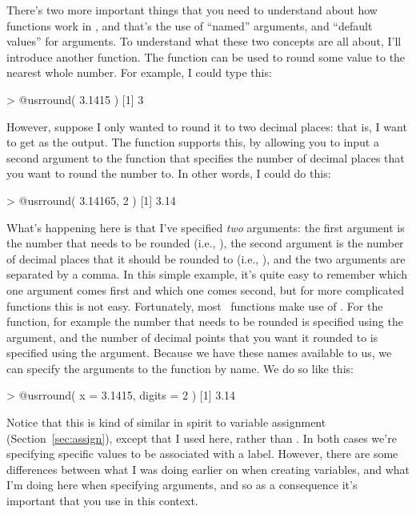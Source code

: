 There's two more important things that you need to understand about how functions work in \R, and that's the use of ``named'' arguments, and ``default values'' for arguments. To understand what these two concepts are all about, I'll introduce another function. The  function can be used to round some value to the nearest whole number. For example, I could type this:
\begin{rblock1}
> @usr{round( 3.1415 )}
[1] 3
\end{rblock1}
However, suppose I only wanted to round it to two decimal places: that is, I want to get  as the output. The  function supports this, by allowing you to input a second argument to the function that specifies the number of decimal places that you want to round the number to. In other words, I could do this: 
\begin{rblock1}
> @usr{round( 3.14165, 2 )}
[1] 3.14
\end{rblock1}
What's happening here is that I've specified {\it two} arguments: the first argument is the number that needs to be rounded (i.e., ), the second argument is the number of decimal places that it should be rounded to (i.e., ), and the two arguments are separated by a comma. In this simple example, it's quite easy to remember which one argument comes first and which one comes second, but for more complicated functions this is not easy. Fortunately, most \R\ functions make use of . For the  function, for example the number that needs to be rounded is specified using the  argument, and the number of decimal points that you want it rounded to is specified using the  argument. Because we have these names available to us, we can specify the arguments to the function by name. We do so like this:
\begin{rblock1}
> @usr{round( x = 3.1415, digits = 2 )}
[1] 3.14
\end{rblock1}
Notice that this is kind of similar in spirit to variable assignment (Section~\ref{sec:assign}), except that I used \rtext{=} here, rather than \rtext{<-}. In both cases we're specifying specific values to be associated with a label. However, there are some differences between what I was doing earlier on when creating variables, and what I'm doing here when specifying arguments, and so as a consequence it's important that you use \rtext{=} in this context.


